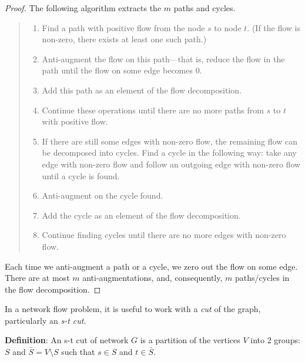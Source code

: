 \documentclass{article}
\begin{document}
\begin{proof}
  The following algorithm extracts the $m$ paths and cycles.
  
  \begin{quote}
    \begin{enumerate}
      \item
        Find a path with positive flow from the node $s$ to node
        $t$. (If the flow is non-zero, there exists at least one such
        path.) 
      \item
        Anti-augment the flow on this path---that is, reduce the flow in
        the path until the flow on some edge becomes 0.
      \item
        Add this path as an element of the flow decomposition.
      \item
        Continue these operations until there are no more paths from
        $s$ to $t$ with positive flow.
      \item
        If there are still some edges with non-zero flow, the
        remaining flow can be decomposed into cycles. Find a cycle in
        the following way: take any edge with non-zero flow and follow
        an outgoing edge with non-zero flow until a cycle is found.
      \item
        Anti-augment on the cycle found.
      \item
        Add the cycle as an element of the flow decomposition.
      \item
        Continue finding cycles until there are no more edges with
        non-zero flow.
    \end{enumerate}
  \end{quote}
  
  Each time we anti-augment a path or a cycle, we zero out the
  flow on some edge. There are at most $m$ anti-augmentations, and,
  consequently, $m$ paths/cycles in the flow decomposition.
\end{proof}


In a network flow problem, it is useful to work with a {\em cut} of the
graph, particularly an {\em s-t cut}.


\textbf{Definition}:
An s-t cut of network $G$ is a partition of the vertices $V$ into 2 groups: $S$ and
$\bar{S}=V\setminus S$ such that $s\in S$ and $t\in \bar{S}$.  
\end{document}
